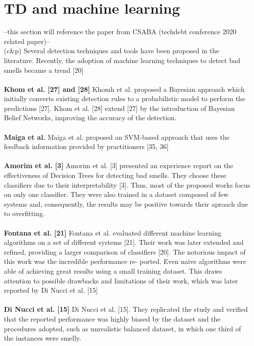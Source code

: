 \section{TD and machine learning}

--this section will reference the paper from CSABA (techdebt conference 2020 related paper)--
\\
(c\&p) Several detection techniques and tools have been proposed in the literature. Recently, the adoption of machine learning techniques to detect bad smells became a trend [20]
\\
\\
\textbf{Khom et al. [27] and [28]}
Khomh et al. proposed a Bayesian approach which initially converts existing detection rules to a probabilistic model to perform the predictions [27].
Khom et al. [28] extend [27] by the introduction of Bayesian Belief Networks, improving the accuracy of the detection.
\\
\\
\textbf{Maiga et al.}
Maiga et al. proposed an SVM-based approach that uses the feedback information provided by practitioners [35, 36]
\\
\\
\textbf{Amorim et al. [3]}
Amorim et al. [3] presented an experience report on the effectiveness of Decision Trees for detecting bad smells. They choose these classifiers due to their interpretability [3]. Thus, most of the proposed works focus on only one classifier. They were also trained in a dataset composed of few systems and, consequently, the results may be positive towards their aproach due to overfitting.
\\
\\
\textbf{Fontana et al. [21]}
Fontana et al. evaluated different machine learning algorithms on a set of different systems [21]. Their work was later extended and refined, providing a larger comparison of classifiers [20]. The notorious impact of this work was the incredible performance re- ported. Even naive algorithms were able of achieving great results using a small training dataset. This draws attention to possible drawbacks and limitations of their work, which was later reported by Di Nucci et al. [15]
\\
\\
\textbf{Di Nucci et al. [15]}
Di Nucci et al. [15]. They replicated the study and verified that the reported performance was highly biased by the dataset and the procedures adopted, such as unrealistic balanced dataset, in which one third of the instances were smelly.
